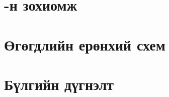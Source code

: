 
\section{\ttitle-н зохиомж} %

\label{Chapter4} %

\section{Өгөгдлийн ерөнхий схем}






\section{Бүлгийн дүгнэлт}
